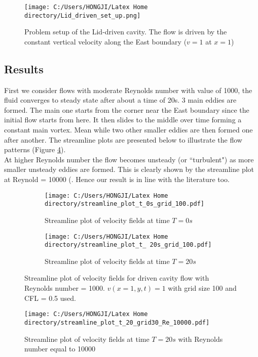 \begin{figure}[H]
	\centering
	\texttt{[image: C:/Users/HONGJI/Latex Home directory/Lid\_driven\_set\_up.png]}
	\caption{Problem setup of the Lid-driven cavity. The flow is driven by the constant vertical velocity along the East boundary ($v=1$ at $x=1$)  }	
\label{fig:6.18}
\end{figure}

\subsection{Results}
First we consider flows with moderate Reynolds number with value of 1000, the fluid converges to steady state after about a time of 20s. 3 main eddies are formed. The main one starts from the corner near the East boundary since the initial flow starts from here. It then slides to the middle over time forming a constant main vortex. Mean while two other smaller eddies are then formed one after another. The streamline plots are presented below to illustrate the flow patterns (Figure \ref{fig:6.19}).\\

At higher Reynolds number the flow becomes unsteady (or ``turbulent") as more smaller unsteady eddies are formed. This is clearly shown by the streamline plot at Reynold = 10000 (. Hence our result is in line with the literature too.\\

\begin{figure}[H]
	\centering
	\begin{subfigure}[t]{2.5in}
		\centering
		\texttt{[image: C:/Users/HONGJI/Latex Home directory/streamline\_plot\_t\_0s\_grid\_100.pdf]}
		\caption{Streamline plot of velocity fields at time $T = 0s$}\label{fig:6.19a}		
	\end{subfigure}
	\quad
	\begin{subfigure}[t]{2.5in}
		\centering
		\texttt{[image: C:/Users/HONGJI/Latex Home directory/streamline\_plot\_t\_ 20s\_grid\_100.pdf]}
		\caption{Streamline plot of velocity fields at time $T = 20s$}\label{fig:6.19b}
	\end{subfigure}
	\caption{Streamline plot of velocity fields for driven cavity flow with Reynolds number = 1000. $v(x=1,y,t) = 1$ with grid size 100 and CFL = 0.5 used.}\label{fig:6.19}
\end{figure}

\begin{figure}[H]
	\centering
	\texttt{[image: C:/Users/HONGJI/Latex Home directory/streamline\_plot\_t\_20\_grid30\_Re\_10000.pdf]}
	\caption{Streamline plot of velocity fields at time $T = 20s$ with Reynolds number equal to 10000}\label{fig:6.20}		
\label{fig:6.20}
\end{figure}

